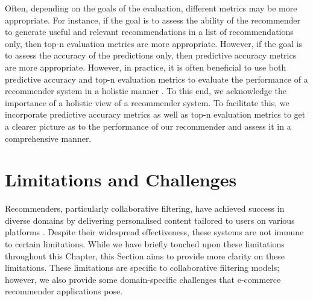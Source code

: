 Often, depending on the goals of the evaluation, different metrics may be more appropriate. For instance, if the goal is to assess the ability of the recommender to generate useful and relevant recommendations in a list of recommendations only, then top-n evaluation metrics are more appropriate. However, if the goal is to assess the accuracy of the predictions only, then predictive accuracy metrics are more appropriate. However, in practice, it is often beneficial to use both predictive accuracy and top-n evaluation metrics to evaluate the performance of a recommender system in a holistic manner \cite{zangerle2022evaluating}. To this end, we acknowledge the importance of a holistic view of a recommender system. To facilitate this, we incorporate predictive accuracy metrics as well as top-n evaluation metrics to get a clearer picture as to the performance of our recommender and assess it in a comprehensive manner.

\section{Limitations and Challenges}
\label{sec:2 Limitations and Challenges}

Recommenders, particularly collaborative filtering, have achieved  success in diverse domains by delivering personalised content tailored to users on various platforms \cite{chen2012critiquing}. Despite their widespread effectiveness, these systems are not immune to certain limitations. While we have briefly touched upon these limitations throughout this Chapter, this Section aims to provide more clarity on these limitations. These limitations are specific to collaborative filtering models; however, we also provide some domain-specific challenges that e-commerce recommender applications pose. 



 